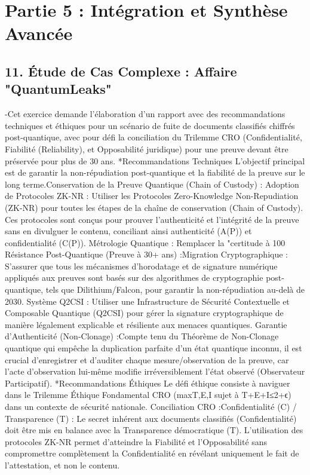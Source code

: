 \documentclass[]{article}
\begin{document}
\section*{Partie 5 : Intégration et Synthèse Avancée}
\subsection*{11. Étude de Cas Complexe : Affaire "QuantumLeaks"}
-Cet exercice demande l'élaboration d'un rapport avec des recommandations techniques et éthiques pour un scénario de fuite de documents classifiés chiffrés post-quantique, avec pour défi la conciliation du Trilemme CRO (Confidentialité, Fiabilité (Reliability), et Opposabilité juridique)  pour une preuve devant être préservée pour plus de 30 ans.
*Recommandations Techniques
L'objectif principal est de garantir la non-répudiation post-quantique et la fiabilité de la preuve sur le long terme.Conservation de la Preuve Quantique (Chain of Custody) :
Adoption de Protocoles ZK-NR : Utiliser les Protocoles Zero-Knowledge Non-Repudiation (ZK-NR)  pour toutes les étapes de la chaîne de conservation (Chain of Custody). Ces protocoles sont conçus pour prouver l'authenticité et l'intégrité de la preuve sans en divulguer le contenu, conciliant ainsi authenticité (A(P)) et confidentialité (C(P)).
Métrologie Quantique : Remplacer la "certitude à 100%
Résistance Post-Quantique (Preuve à 30+ ans) :Migration Cryptographique : S'assurer que tous les mécanismes d'horodatage et de signature numérique appliqués aux preuves sont basés sur des algorithmes de cryptographie post-quantique, tels que Dilithium/Falcon, pour garantir la non-répudiation au-delà de 2030.
Système Q2CSI : Utiliser une Infrastructure de Sécurité Contextuelle et Composable Quantique (Q2CSI)  pour gérer la signature cryptographique de manière légalement explicable et résiliente aux menaces quantiques.
Garantie d'Authenticité (Non-Clonage) :Compte tenu du Théorème de Non-Clonage quantique qui empêche la duplication parfaite d'un état quantique inconnu, il est crucial d'enregistrer et d'auditer chaque mesure/observation de la preuve, car l'acte d'observation lui-même modifie irréversiblement l'état observé (Observateur Participatif).
*Recommandations Éthiques
Le défi éthique consiste à naviguer dans le Trilemme Éthique Fondamental CRO (max{T,E,I} sujet à T+E+I≤2+ϵ)  dans un contexte de sécurité nationale.
Conciliation CRO :Confidentialité (C) / Transparence (T) : Le secret inhérent aux documents classifiés (Confidentialité) doit être mis en balance avec la Transparence démocratique (T). L'utilisation des protocoles ZK-NR permet d'atteindre la Fiabilité et l'Opposabilité sans compromettre complètement la Confidentialité en révélant uniquement le fait de l'attestation, et non le contenu.
\end{document}
